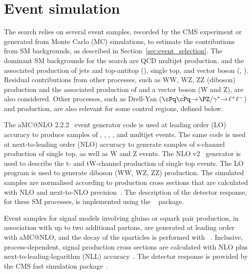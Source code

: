 \section{Event simulation}
\label{sec:event_simulation}

The search relies on several event samples, recorded by the CMS
experiment or generated from Monte Carlo (MC) simulations, to estimate
the contributions from SM backgrounds, as described in
Section~\ref{sec:event_selection}. 
The dominant SM backgrounds for the search are QCD multijet
production, and the associated production of jets and top-antitop
(\ttbar), single top, and vector boson (\wlnu, \znunu). Residual
contributions from other processes, such as WW, WZ, ZZ (diboson)
production and the associated production of \ttbar and a vector boson
(W and Z), are also considered. Other processes, such as Drell-Yan
($\cPq\bar{\cPq}\!  \rightarrow\! \PZ/\gamma^*\! \rightarrow\!
\ell^+\ell^-$) and \gj production, are also relevant for some control
regions, defined below.

The  aMC@NLO 2.2.2~\cite{Alwall2014} event generator code is
used at leading order (LO) accuracy to produce samples of \wj, \zj,
\gj, \ttbar, and multijet events. The same code is used at
next-to-leading order (NLO) accuracy to generate samples of s-channel
production of single top, as well as {\ttbar}W and {\ttbar}Z
events. The NLO \POWHEG v2~\cite{powheg, powheg_top_Wt} generator is
used to describe the t- and tW-channel production of single top
events. The LO ~\cite{pythia} program is used to generate
diboson (WW, WZ, ZZ) production. The simulated samples are normalised
according to production cross sections that are calculated with NLO
and next-to-NLO precision~\cite{Alwall2014, wphys, fewz, wwxs, top++,
  nlotop, powheg_top_Wt}. The description of the detector response,
for these SM processes, is implemented using the
\GEANTfour~\cite{geant} package.

Event samples for signal models involving gluino or squark pair
production, in association with up to two additional partons, are
generated at leading order with  aMC@NLO, and the decay of
the sparticles is performed with ~\cite{pythia}. Inclusive,
process-dependent, signal production cross sections are calculated
with NLO plus next-to-leading-logarithm (NLL)
accuracy~\cite{Beenakker:1996ch, PhysRevLett.102.111802,
  PhysRevD.80.095004, 1126-6708-2009-12-041,
  doi:10.1142/S0217751X11053560, susynlo}. The detector response is
provided by the CMS fast simulation package~\cite{fastsim}.

